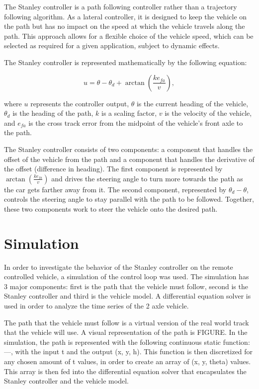 \documentclass[arbeit=studie,oneside,BCOR=12mm]{ArbeitRST}
\begin{document}
The Stanley controller is a path following controller rather than a trajectory
following algorithm. As a lateral controller, it is designed to keep the
vehicle on the path but has no impact on the speed at which the vehicle travels
along the path. This approach allows for a flexible choice of the vehicle
speed, which can be selected as required for a given application, subject to
dynamic effects.

The Stanley controller is represented mathematically by the following equation:

\begin{equation}
  u = \theta - \theta_d + \arctan\left(\frac{ke_{fa}}{v}\right),
  \label{eq:Stanley Controller}
\end{equation}

where $u$ represents the controller output, $\theta$ is the current heading of
the vehicle, $\theta_d$ is the heading of the path, $k$ is a scaling factor,
$v$ is the velocity of the vehicle, and $e_{fa}$ is the cross track error from
the midpoint of the vehicle's front axle to the path.

The Stanley controller consists of two components: a component that handles the
offset of the vehicle from the path and a component that handles the derivative
of the offset (difference in heading). The first component is represented by
$\arctan(\frac{ke_{fa}}{v})$ and drives the steering angle to turn more towards
the path as the car gets farther away from it. The second component,
represented by $\theta_d - \theta$, controls the steering angle to stay
parallel with the path to be followed. Together, these two components work to
steer the vehicle onto the desired path.


\section{Simulation}
In order to investigate the behavior of the Stanley controller on the remote
controlled vehicle, a simulation of the control loop was used. The simulation
has 3 major components: first is the path that the vehicle must follow, second
is the Stanley controller and third is the vehicle model. A differential
equation solver is used in order to analyze the time series of the 2 axle
vehicle. 

The path that the vehicle must follow is a virtual version of the real world
track that the vehicle will use. A visual representation of the path is FIGURE.
In the simulation, the path is represented with the following continuous static
function: 
---, 
with the input t and the output (x, y, h). This function is
then discretized for any chosen amount of t values, in order to create an array
of (x, y, theta) values. This array is then fed into the differential equation
solver that encapsulates the Stanley controller and the vehicle model. 
\end{document}
